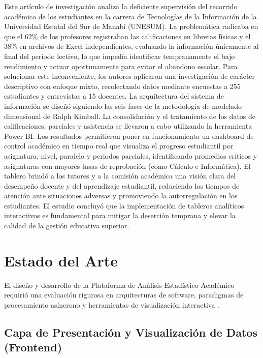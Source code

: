 Este artículo de investigación analiza la deficiente supervisión del recorrido académico de los estudiantes en la carrera de Tecnologías de la Información de la Universidad Estatal del Sur de Manabí (UNESUM). La problemática radicaba en que el 62\% de los profesores registraban las calificaciones en libretas físicas y el 38\% en archivos de Excel independientes, evaluando la información únicamente al final del periodo lectivo, lo que impedía identificar tempranamente el bajo rendimiento y actuar oportunamente para evitar el abandono escolar.
Para solucionar este inconveniente, los autores aplicaron una investigación de carácter descriptivo con enfoque mixto, recolectando datos mediante encuestas a 255 estudiantes y entrevistas a 15 docentes. La arquitectura del sistema de información se diseñó siguiendo las seis fases de la metodología de modelado dimensional de Ralph Kimball. La consolidación y el tratamiento de los datos de calificaciones, parciales y asistencia se llevaron a cabo utilizando la herramienta Power BI.
Los resultados permitieron poner en funcionamiento un dashboard de control académico en tiempo real que visualiza el progreso estudiantil por asignatura, nivel, paralelo y periodos parciales, identificando promedios críticos y asignaturas con mayores tasas de reprobación (como Cálculo e Informática). El tablero brindó a los tutores y a la comisión académica una visión clara del desempeño docente y del aprendizaje estudiantil, reduciendo los tiempos de atención ante situaciones adversas y promoviendo la autorregulación en los estudiantes. El estudio concluyó que la implementación de tableros analíticos interactivos es fundamental para mitigar la deserción temprana y elevar la calidad de la gestión educativa superior.

\newpage

\section{Estado del Arte}

El diseño y desarrollo de la Plataforma de Análisis Estadístico Académico requirió una evaluación rigurosa en arquitecturas de software, paradigmas de procesamiento asíncrono y herramientas de visualización interactiva \cite{sommerville2016, pressman2020, fowler2002}. 

\subsection{Capa de Presentación y Visualización de Datos (Frontend)}

